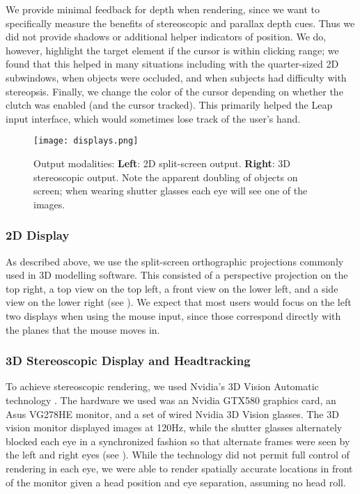We provide minimal feedback for depth when rendering, since we want to
specifically measure the benefits of stereoscopic and parallax depth
cues. Thus we did not provide shadows or additional helper indicators of
position. We do, however, highlight the target element if the cursor is within
clicking range; we found that this helped in many situations including with
the quarter-sized 2D subwindows, when objects were occluded, and when subjects
had difficulty with stereopsis. Finally, we change the color of the cursor
depending on whether the clutch was enabled (and the cursor tracked). This
primarily helped the Leap input interface, which would sometimes lose track of
the user's hand.

\begin{figure}
    \centering
    \texttt{[image: displays.png]}
    \caption{Output modalities: {\bf Left}: 2D split-screen output. {\bf Right}:
    3D stereoscopic output. Note the apparent doubling of objects on screen;
when wearing shutter glasses each eye will see one of the images.}
    \label{fig:output}
\end{figure}

\subsubsection{2D Display}
As described above, we use the split-screen orthographic projections commonly
used in 3D modelling software. This consisted of a perspective projection on
the top right, a top view on the top left, a front view on the lower left, and
a side view on the lower right (see ). We expect that most
users would focus on the left two displays when using the mouse input, since
those correspond directly with the planes that the mouse moves in.

\subsubsection{3D Stereoscopic Display and Headtracking}
To achieve stereoscopic rendering, we used Nvidia's 3D Vision Automatic
technology \cite{nvidia3dvision}. The hardware we used was an Nvidia GTX580
graphics card, an Asus VG278HE monitor, and a set of wired Nvidia 3D Vision
glasses. The 3D vision monitor displayed images at 120Hz, while the shutter
glasses alternately blocked each eye in a synchronized fashion so that alternate
frames were seen by the left and right eyes (see ). While
the technology did not permit full control of rendering in each
eye, we were able to render spatially accurate locations in front of the
monitor given a head position and eye separation, assuming no head roll.

